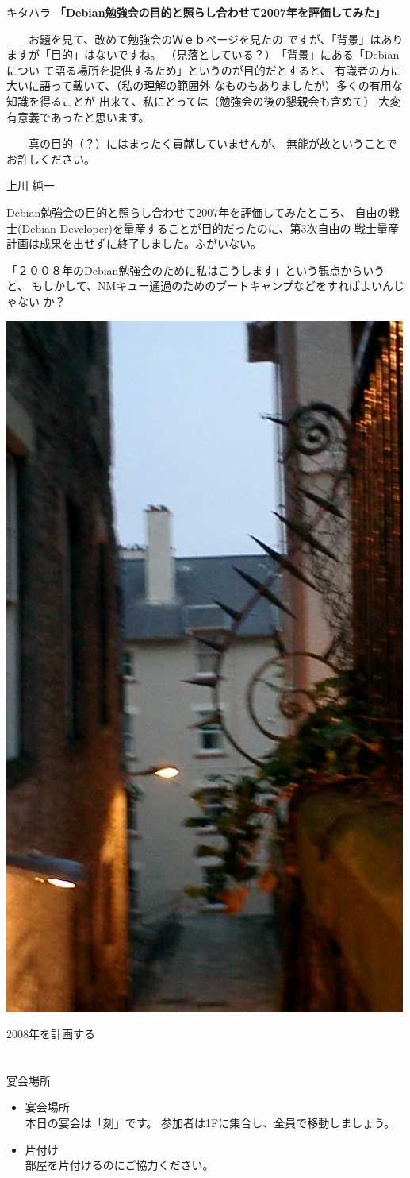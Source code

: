 \documentclass[cjk,dvipdfmx,12pt]{beamer}
\newcommand{\emtext}[1]{
\begin{frame}{}

\begin{minipage}{0.55\hsize}
\includegraphics[width=1\hsize]{image200707/gurutitle.jpg}
\end{minipage}
\begin{minipage}{0.39\hsize}
 {\Huge #1
 }
\end{minipage}
\end{frame}
}
\begin{document}
\begin{frame}{キタハラ}
\textbf{「Debian勉強会の目的と照らし合わせて2007年を評価してみた」}

　　お題を見て、改めて勉強会のＷｅｂページを見たの
ですが、「背景」はありますが「目的」はないですね。
（見落としている？）　「背景」にある「Debian につい
て語る場所を提供するため」というのが目的だとすると、
有識者の方に大いに語って戴いて、（私の理解の範囲外
なものもありましたが）多くの有用な知識を得ることが
出来て、私にとっては（勉強会の後の懇親会も含めて）
大変有意義であったと思います。

　　真の目的（？）にはまったく貢献していませんが、
無能が故ということでお許しください。

\end{frame}\begin{frame}{上川 純一}

Debian勉強会の目的と照らし合わせて2007年を評価してみたところ、
自由の戦士(Debian Developer)を量産することが目的だったのに、第3次自由の
戦士量産計画は成果を出せずに終了しました。ふがいない。

「２００８年のDebian勉強会のために私はこうします」という観点からいうと、
もしかして、NMキュー通過のためのブートキャンプなどをすればよいんじゃない
か？

\end{frame}



\emtext{2008年を計画する}


\section{}
\begin{frame}{宴会場所}

\begin{itemize}
 \item 宴会場所\\
       本日の宴会は「刻」です。
  参加者は1Fに集合し、全員で移動しましょう。
 \item 片付け\\
       部屋を片付けるのにご協力ください。
\end{itemize}


\end{frame}
\end{document}
